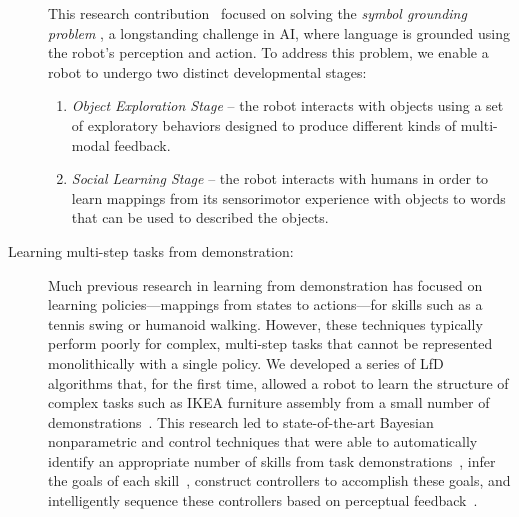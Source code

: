 \documentclass[runningheads,a4paper]{llncs}
\begin{document}
\begin{description}
This research contribution~\cite{thomason:ijcai16} focused on solving the {\it symbol
grounding problem} \cite{harnad1990symbol}, a longstanding challenge
in AI, where language is grounded using the robot's perception and
action.
To address this problem, we enable a robot to undergo two distinct developmental stages:

\begin{enumerate}
\item {\it Object Exploration Stage} -- the robot interacts with objects using a set of exploratory behaviors designed to produce different kinds of multi-modal feedback.
\item {\it Social Learning Stage} -- the robot interacts with humans in order to learn mappings from its sensorimotor experience with objects to words that can be used to described the objects.
\end{enumerate}


\item[Learning multi-step tasks from demonstration:]
Much previous research in learning from demonstration has focused on
learning policies---mappings from states to actions---for skills such
as a tennis swing or humanoid walking.  However, these techniques
typically perform poorly for complex, multi-step tasks that cannot be
represented monolithically with a single policy.  We developed a
series of LfD algorithms that, for the first time, allowed a robot to
learn the structure of complex tasks such as IKEA furniture assembly
from a small number of
demonstrations~\cite{niekum2013semantically,niekum2013incremental,niekum2015online,niekum2012learning,niekum2015learning}. This
research led to state-of-the-art Bayesian nonparametric and control
techniques that were able to automatically identify an appropriate
number of skills from task demonstrations~\cite{niekum2012learning},
infer the goals of each
skill~\cite{niekum2011clustering,niekum2015online}, construct
controllers to accomplish these goals, and intelligently sequence
these controllers based on perceptual
feedback~\cite{niekum2013semantically,niekum2013incremental,niekum2015learning}.


\end{description}
\end{document}
